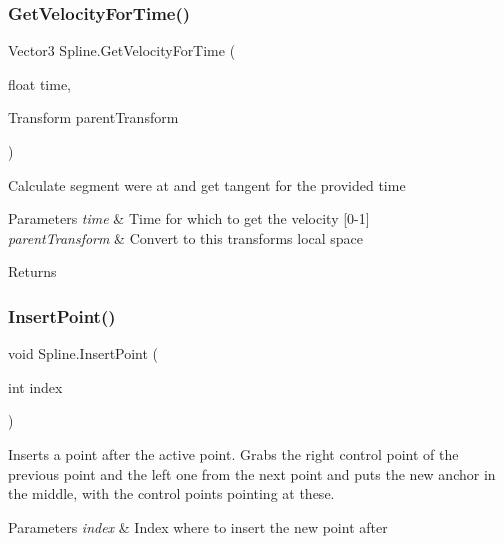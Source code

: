 \subsubsection{\texorpdfstring{Get\+Velocity\+For\+Time()}{GetVelocityForTime()}}
{\footnotesize\ttfamily Vector3 Spline.\+Get\+Velocity\+For\+Time (\begin{DoxyParamCaption}\item[{float}]{time,  }\item[{Transform}]{parent\+Transform }\end{DoxyParamCaption})}



Calculate segment we\textquotesingle{}re at and get tangent for the provided time 


\begin{DoxyParams}{Parameters}
{\em time} & Time for which to get the velocity \mbox{[}0-\/1\mbox{]}\\
\hline
{\em parent\+Transform} & Convert to this transform\textquotesingle{}s local space \\
\hline
\end{DoxyParams}
\begin{DoxyReturn}{Returns}

\end{DoxyReturn}
\mbox{\label{class_spline_a3462f1dda107d0ec20ecdff11df7ab88}} 
\subsubsection{\texorpdfstring{Insert\+Point()}{InsertPoint()}}
{\footnotesize\ttfamily void Spline.\+Insert\+Point (\begin{DoxyParamCaption}\item[{int}]{index }\end{DoxyParamCaption})}



Inserts a point after the active point. Grabs the right control point of the previous point and the left one from the next point and puts the new anchor in the middle, with the control points pointing at these. 


\begin{DoxyParams}{Parameters}
{\em index} & Index where to insert the new point after\\
\hline
\end{DoxyParams}
\mbox{\label{class_spline_a045ca3ecc4c7e42c054150204833a40c}} 
